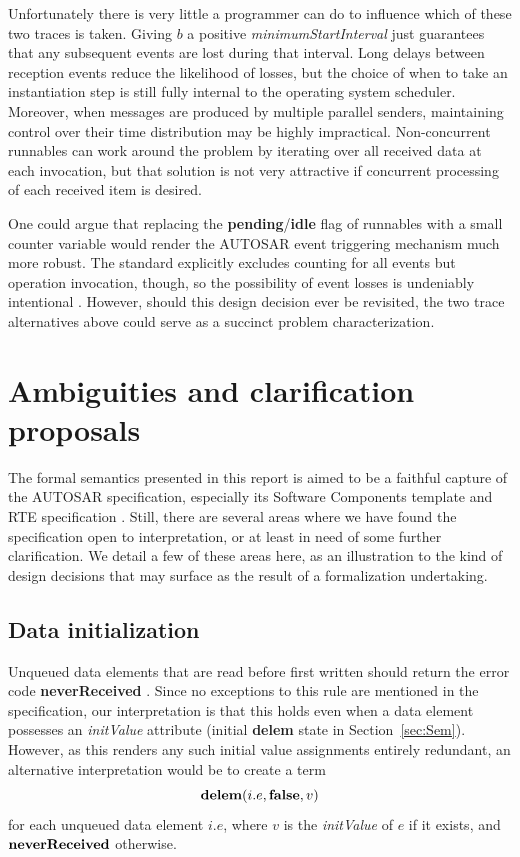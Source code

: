 \documentclass[10pt,conference]{IEEEtran}
\begin{document}
Unfortunately there is very little a programmer can do to influence which of these two traces is taken. Giving $b$ a positive \emph{minimumStartInterval} just guarantees that any subsequent events are lost during that interval. Long delays between reception events reduce the likelihood of losses, but the choice of when to take an instantiation step is still fully internal to the operating system scheduler. Moreover, when messages are produced by multiple parallel senders, maintaining control over their time distribution may be highly impractical. Non-concurrent runnables can work around the problem by iterating over all received data at each invocation, but that solution is not very attractive if concurrent processing of each received item is desired.

One could argue that replacing the {\bf pending}/{\bf idle} flag of runnables with a small counter variable would render the AUTOSAR event triggering mechanism much more robust. The standard explicitly excludes counting for all events but operation invocation, though, so the possibility of event losses is undeniably intentional \cite[p.~128]{AR:RTE}. However, should this design decision ever be revisited, the two trace alternatives above could serve as a succinct problem characterization.


\section{Ambiguities and clarification proposals}
\label{sec:Amb}

The formal semantics presented in this report is aimed to be a faithful capture of the AUTOSAR specification, especially its Software Components template and RTE specification \cite{AR:SWC, AR:RTE}. Still, there are several areas where we have found the specification open to interpretation, or at least in need of some further clarification. We detail a few of these areas here, as an illustration to the kind of design decisions that may surface as the result of a formalization undertaking.


\subsection{Data initialization}

Unqueued data elements that are read before first written should return the error code {\bf neverReceived} \cite[ch.~5.6.10]{AR:RTE}. Since no exceptions to this rule are mentioned in the specification, our interpretation is that this holds even when a data element possesses an \emph{initValue} attribute  (initial {\bf delem} state in Section~\ref{sec:Sem}). However, as this renders any such initial value assignments entirely redundant, an alternative interpretation would be to create a term
$$
  \textbf{delem}(i.e,\textbf{false},v)
$$
for each unqueued data element $i.e$, where $v$ is the \emph{initValue} of $e$ if it exists, and $\textbf{neverReceived}$ otherwise.
\end{document}
